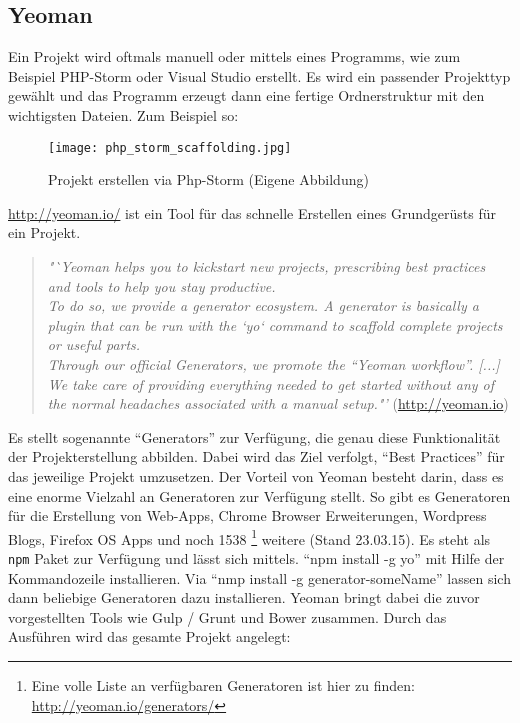 
	\subsection{Yeoman} %
	\label{sub:yeoman}
		Ein Projekt wird oftmals manuell oder mittels eines Programms, wie zum Beispiel PHP-Storm oder Visual Studio erstellt. Es wird ein passender Projekttyp gewählt und das Programm erzeugt dann eine fertige Ordnerstruktur mit den wichtigsten Dateien. Zum Beispiel so:

		\begin{figure}[htbp]
			\begin{center}
				\texttt{[image: php\_storm\_scaffolding.jpg]}
				\caption{Projekt erstellen via Php-Storm (Eigene Abbildung)}
				\label{fig:php_storm_scaffolding}
			\end{center}
		\end{figure}
		
		\url{http://yeoman.io/} ist ein Tool für das schnelle Erstellen eines Grundgerüsts für ein Projekt.

		\begin{quote}
			\textit{"`Yeoman helps you to kickstart new projects, prescribing best practices and tools to help you stay productive.\\
			To do so, we provide a generator ecosystem. A generator is basically a plugin that can be run with the `yo` command to scaffold complete projects or useful parts.\\
			Through our official Generators, we promote the "`Yeoman workflow"'. [...] We take care of providing everything needed to get started without any of the normal headaches associated with a manual setup."'} (\url{http://yeoman.io})
		\end{quote}

		Es stellt sogenannte "`Generators"' zur Verfügung, die genau diese Funktionalität der Projekterstellung abbilden. Dabei wird das Ziel verfolgt, "`Best Practices"' für das jeweilige Projekt umzusetzen.
		Der Vorteil von Yeoman besteht darin, dass es eine enorme Vielzahl an Generatoren zur Verfügung stellt. So gibt es Generatoren für die Erstellung von Web-Apps, Chrome Browser Erweiterungen, Wordpress Blogs, Firefox OS Apps und noch 1538 \footnote{Eine volle Liste an verfügbaren Generatoren ist hier zu finden: \url{http://yeoman.io/generators/}} weitere (Stand 23.03.15). 
		Es steht als \texttt{npm} Paket zur Verfügung und lässt sich mittels. "`npm install -g yo"' mit Hilfe der Kommandozeile installieren. Via "`nmp install -g generator-someName"' lassen sich dann beliebige Generatoren dazu installieren. Yeoman bringt dabei die zuvor vorgestellten Tools wie Gulp / Grunt und Bower zusammen. Durch das Ausführen wird das gesamte Projekt angelegt:
		

